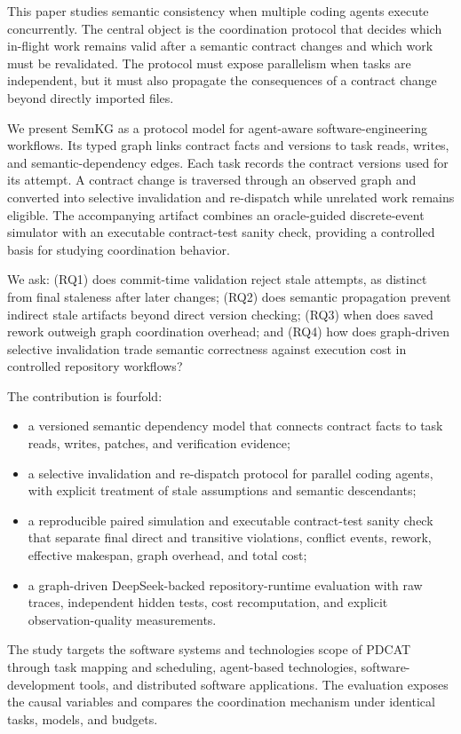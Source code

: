 \documentclass[a4paper,runningheads]{llncs}
\begin{document}
This paper studies semantic consistency when multiple coding agents execute concurrently. The central object is the coordination protocol that decides which in-flight work remains valid after a semantic contract changes and which work must be revalidated. The protocol must expose parallelism when tasks are independent, but it must also propagate the consequences of a contract change beyond directly imported files.

We present SemKG as a protocol model for agent-aware software-engineering workflows. Its typed graph links contract facts and versions to task reads, writes, and semantic-dependency edges. Each task records the contract versions used for its attempt. A contract change is traversed through an observed graph and converted into selective invalidation and re-dispatch while unrelated work remains eligible. The accompanying artifact combines an oracle-guided discrete-event simulator with an executable contract-test sanity check, providing a controlled basis for studying coordination behavior.

We ask: (RQ1) does commit-time validation reject stale attempts, as distinct from final staleness after later changes; (RQ2) does semantic propagation prevent indirect stale artifacts beyond direct version checking; (RQ3) when does saved rework outweigh graph coordination overhead; and (RQ4) how does graph-driven selective invalidation trade semantic correctness against execution cost in controlled repository workflows?

The contribution is fourfold:
\begin{itemize}
\item a versioned semantic dependency model that connects contract facts to task reads, writes, patches, and verification evidence;
\item a selective invalidation and re-dispatch protocol for parallel coding agents, with explicit treatment of stale assumptions and semantic descendants;
\item a reproducible paired simulation and executable contract-test sanity check that separate final direct and transitive violations, conflict events, rework, effective makespan, graph overhead, and total cost;
\item a graph-driven DeepSeek-backed repository-runtime evaluation with raw traces, independent hidden tests, cost recomputation, and explicit observation-quality measurements.
\end{itemize}

The study targets the software systems and technologies scope of PDCAT through task mapping and scheduling, agent-based technologies, software-development tools, and distributed software applications. The evaluation exposes the causal variables and compares the coordination mechanism under identical tasks, models, and budgets.
\end{document}
